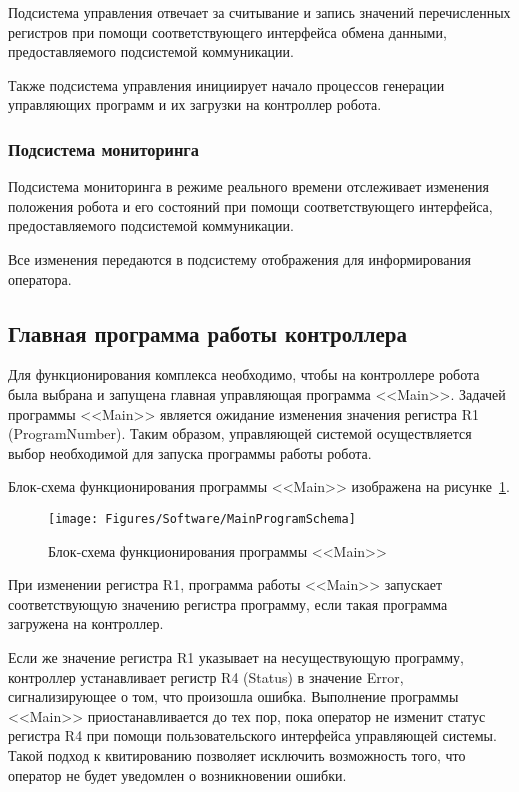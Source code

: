 Подсистема управления отвечает за считывание и запись значений перечисленных регистров при помощи соответствующего интерфейса обмена данными, предоставляемого подсистемой коммуникации.

Также подсистема управления инициирует начало процессов генерации управляющих программ и их загрузки на контроллер робота.

\subsubsection*{Подсистема мониторинга}
Подсистема мониторинга в режиме реального времени отслеживает изменения положения робота и его состояний при помощи соответствующего интерфейса, предоставляемого подсистемой коммуникации.

Все изменения передаются в подсистему отображения для информирования оператора.

\subsection{Главная программа работы контроллера}
Для функционирования комплекса необходимо, чтобы на контроллере робота была выбрана и запущена главная управляющая программа <<Main>>.
Задачей программы <<Main>> является ожидание изменения значения регистра R1 (ProgramNumber).
Таким образом, управляющей системой осуществляется выбор необходимой для запуска программы работы робота.

Блок-схема функционирования программы <<Main>> изображена на рисунке~\ref{fig:Software:MainProgramSchema}.

\begin{figure}[H]
    \centering
    \vspace{14pt}
    \texttt{[image: Figures/Software/MainProgramSchema]}
    \caption{Блок-схема функционирования программы <<Main>>}
    \label{fig:Software:MainProgramSchema}
\end{figure}

При изменении регистра R1, программа работы <<Main>> запускает соответствующую значению регистра программу, если такая программа загружена на контроллер.

Если же значение регистра R1 указывает на несуществующую программу, контроллер устанавливает регистр R4 (Status) в значение Error, сигнализирующее о том, что произошла ошибка.
Выполнение программы <<Main>> приостанавливается до тех пор, пока оператор не изменит статус регистра R4 при помощи пользовательского интерфейса управляющей системы.
Такой подход к квитированию позволяет исключить возможность того, что оператор не будет уведомлен о возникновении ошибки.

